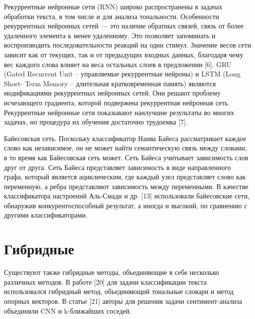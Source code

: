 Рекуррентные нейронные сети (RNN) широко распространены в задачах обработки
текста, в том числе и для анализа тональности. Особенности рекуррентных
нейронных сетей — это наличие обратных связей, связь от более удаленного
элемента к менее удаленному. Это позволяет запоминать и воспроизводить
последовательности реакций на один стимул. Значение весов сети зависит как от
текущих, так и от предыдущих входных данных, благодаря чему вес каждого слова
влияет на веса остальных слоев в предложении [6].
GRU (Gated Recurrent Unit – управляемые рекуррентные нейроны) и LSTM (Long
Short- Term Memory – длительная кратковременная память) являются модификациями
рекуррентных нейронных сетей. Они решают проблему исчезающего градиента, которой
подвержена рекуррентная нейронная сеть.
Рекуррентные нейронные сети показывают наилучшие результаты во многих задачах,
но процедура их обучения достаточно трудоемка [7]. \cite{article9}

Байесовская сеть. Поскольку классификатор Наива Байеса рассматривает каждое
слово как независимое, он не может найти семантическую связь между словами, в то
время как Байесовская сеть может. Сеть Байеса учитывает зависимость слов друг от
друга. Сеть Байеса представляет зависимость в виде направленного графа, который
является ациклическим, где каждый узел представляет слово как переменную, а
ребра представляют зависимость между переменными. В качестве классификатора
настроений Аль-Смади и др. [13] использовали байесовские сети, обнаружив
конкурентоспособный результат, а иногда и высокий, по сравнению с другими
классификаторами. \cite{article16}

\section{Гибридные}

Существуют также гибридные методы, объединяющие в себе несколько различных
методов.  В работе [20] для задачи классификации текста использовался гибридный
метод, объединяющий тональные словари и метод опорных векторов.  В статье [21]
авторы для решения задачи сентимент-анализа объединяли CNN и k-ближайших
соседей. \cite{article14}

